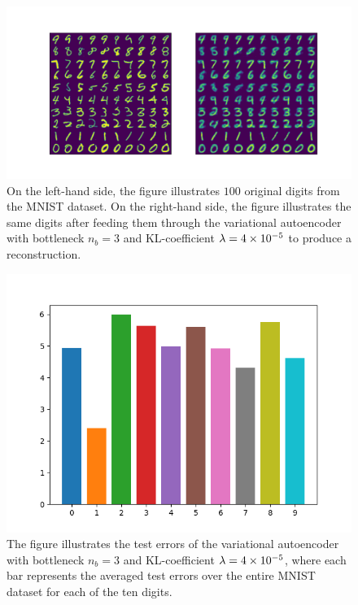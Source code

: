 \begin{figure}
\begin{center}
      \includegraphics[trim = 15mm 10mm 15mm 15mm, clip, width=\linewidth]{convolutional_VAE_snd_KL_4e-5_10k_epochs_3D_inference}
\end{center}
\caption{On the left-hand side, the figure illustrates $100$ original digits from the MNIST dataset. On the right-hand side, the figure illustrates the same digits after feeding them through the variational autoencoder with bottleneck $n_b=3$ and KL-coefficient $\lambda = \num{4e-5}$ to produce a reconstruction.}\label{fig:convolutional_VAE_snd_KL_4e-5_10k_epochs_3D_inference}
\end{figure}


\begin{figure}
\begin{center}
      \includegraphics[width=0.49\linewidth]{convolutional_VAE_snd_KL_4e-5_10k_epochs_3D_errors}
\end{center}
\caption{The figure illustrates the test errors of the variational autoencoder with bottleneck $n_b=3$ and KL-coefficient $\lambda = \num{4e-5}$, where each bar represents the averaged test errors over the entire MNIST dataset for each of the ten digits.}\label{fig:convolutional_VAE_snd_KL_4e-5_10k_epochs_3D_errors}
\end{figure}


